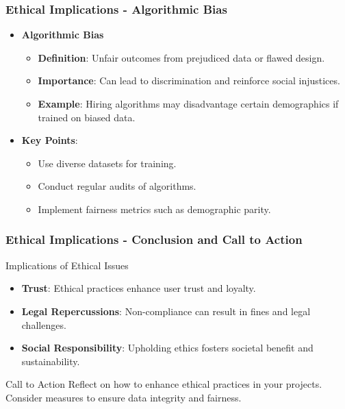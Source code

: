 \documentclass[aspectratio=169]{beamer}
\begin{document}
\begin{frame}[fragile]
    \frametitle{Ethical Implications - Algorithmic Bias}
    \begin{itemize}
        \item \textbf{Algorithmic Bias}
            \begin{itemize}
                \item \textbf{Definition}: Unfair outcomes from prejudiced data or flawed design.
                \item \textbf{Importance}: Can lead to discrimination and reinforce social injustices.
                \item \textbf{Example}: Hiring algorithms may disadvantage certain demographics if trained on biased data.
            \end{itemize}
        \item \textbf{Key Points}:
            \begin{itemize}
                \item Use diverse datasets for training.
                \item Conduct regular audits of algorithms.
                \item Implement fairness metrics such as demographic parity.
            \end{itemize}
    \end{itemize}
\end{frame}

\begin{frame}[fragile]
    \frametitle{Ethical Implications - Conclusion and Call to Action}
    \begin{block}{Implications of Ethical Issues}
        \begin{itemize}
            \item \textbf{Trust}: Ethical practices enhance user trust and loyalty.
            \item \textbf{Legal Repercussions}: Non-compliance can result in fines and legal challenges.
            \item \textbf{Social Responsibility}: Upholding ethics fosters societal benefit and sustainability.
        \end{itemize}
    \end{block}
    \begin{block}{Call to Action}
        Reflect on how to enhance ethical practices in your projects. Consider measures to ensure data integrity and fairness.
    \end{block}
\end{frame}
\end{document}
